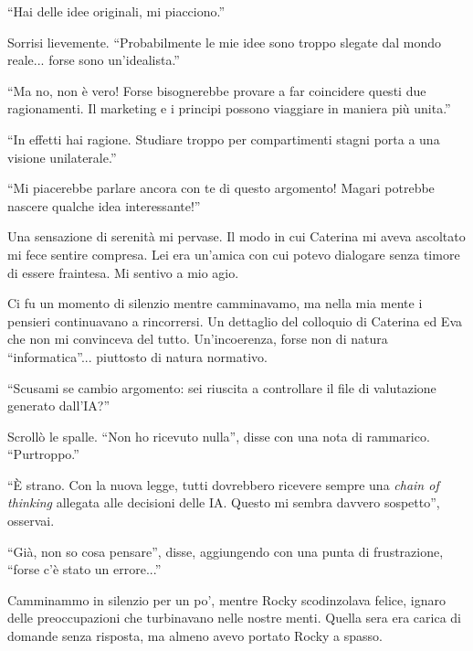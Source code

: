 \begin{dialogue}
 \enquote{Hai delle idee originali, mi piacciono.}

 Sorrisi lievemente. \enquote{Probabilmente le mie idee sono troppo slegate dal mondo reale... forse sono un'idealista.}

 \enquote{Ma no, non è vero! Forse bisognerebbe provare a far coincidere questi due ragionamenti. Il marketing e i principi possono viaggiare in maniera più unita.}

 \enquote{In effetti hai ragione. Studiare troppo per compartimenti stagni porta a una visione unilaterale.}

 \enquote{Mi piacerebbe parlare ancora con te di questo argomento! Magari potrebbe nascere qualche idea interessante!}
\end{dialogue}

Una sensazione di serenità mi pervase. Il modo in cui Caterina mi aveva ascoltato mi fece sentire compresa. Lei era un'amica con cui potevo dialogare senza timore di essere fraintesa. Mi sentivo a mio agio.

Ci fu un momento di silenzio mentre camminavamo, ma nella mia mente i pensieri continuavano a rincorrersi. Un dettaglio del colloquio di Caterina ed Eva che non mi convinceva del tutto. Un'incoerenza, forse non di natura ``informatica''... piuttosto di natura normativo.

\begin{dialogue}
 \enquote{Scusami se cambio argomento: sei riuscita a controllare il file di valutazione generato dall'IA?}

 Scrollò le spalle. \enquote{Non ho ricevuto nulla}, disse con una nota di rammarico. \enquote{Purtroppo.}

 \enquote{È strano. Con la nuova legge, tutti dovrebbero ricevere sempre una \emph{chain of thinking} allegata alle decisioni delle IA. Questo mi sembra davvero sospetto}, osservai.

 \enquote{Già, non so cosa pensare}, disse, aggiungendo con una punta di frustrazione, \enquote{forse c'è stato un errore...}
\end{dialogue}

Camminammo in silenzio per un po', mentre Rocky scodinzolava felice, ignaro delle preoccupazioni che turbinavano nelle nostre menti. Quella sera era carica di domande senza risposta, ma almeno avevo portato Rocky a spasso.



